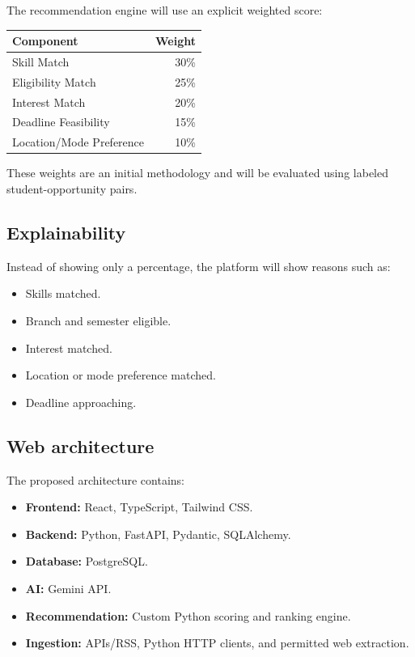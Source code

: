 \documentclass[11pt,a4paper]{article}
\begin{document}
The recommendation engine will use an explicit weighted score:

\begin{center}
\begin{tabular}{lr}
\toprule
Component & Weight\\
\midrule
Skill Match & 30\%\\
Eligibility Match & 25\%\\
Interest Match & 20\%\\
Deadline Feasibility & 15\%\\
Location/Mode Preference & 10\%\\
\bottomrule
\end{tabular}
\end{center}

These weights are an initial methodology and will be evaluated using labeled student-opportunity pairs.

\subsection{Explainability}

Instead of showing only a percentage, the platform will show reasons such as:

\begin{itemize}
\item Skills matched.
\item Branch and semester eligible.
\item Interest matched.
\item Location or mode preference matched.
\item Deadline approaching.
\end{itemize}

\subsection{Web architecture}

The proposed architecture contains:

\begin{itemize}
\item \textbf{Frontend:} React, TypeScript, Tailwind CSS.
\item \textbf{Backend:} Python, FastAPI, Pydantic, SQLAlchemy.
\item \textbf{Database:} PostgreSQL.
\item \textbf{AI:} Gemini API.
\item \textbf{Recommendation:} Custom Python scoring and ranking engine.
\item \textbf{Ingestion:} APIs/RSS, Python HTTP clients, and permitted web extraction.
\end{itemize}
\end{document}
